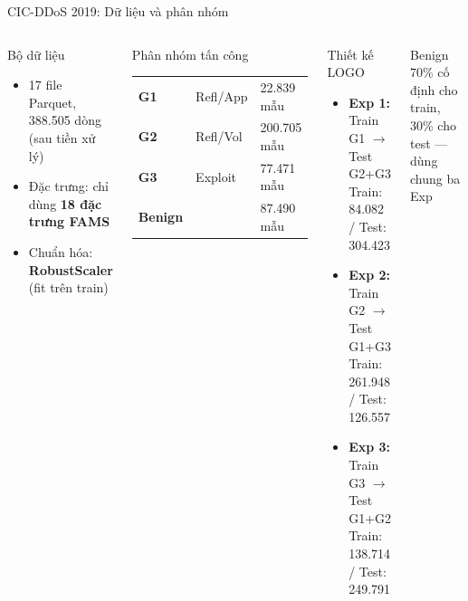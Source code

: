 \documentclass[aspectratio=169,12pt]{beamer}
\newcommand{\sidenote}[1]{\textcolor{mygray}{\small #1}}
\begin{document}
\begin{frame}{CIC-DDoS 2019: Dữ liệu và phân nhóm}
  \begin{columns}[T]
      \begin{block}{Bộ dữ liệu}
        \begin{itemize}
          \item 17 file Parquet, 388.505 dòng (sau tiền xử lý)
          \item Đặc trưng: chỉ dùng \textbf{18 đặc trưng FAMS}
          \item Chuẩn hóa: \textbf{RobustScaler} (fit trên train)
        \end{itemize}
      \end{block}
      \vspace{0.4em}
      \begin{block}{Phân nhóm tấn công}
        \small
        \begin{tabular}{lll}
          \textbf{G1} & Refl/App & 22.839 mẫu\\
          \textbf{G2} & Refl/Vol & 200.705 mẫu\\
          \textbf{G3} & Exploit  & 77.471 mẫu\\
          \textbf{Benign} &      & 87.490 mẫu\\
        \end{tabular}
      \end{block}
      \begin{alertblock}{Thiết kế LOGO}
        \small
        \begin{itemize}
          \item \textbf{Exp 1:} Train G1 $\to$ Test G2+G3\\
                Train: 84.082 / Test: 304.423
          \vspace{0.2em}
          \item \textbf{Exp 2:} Train G2 $\to$ Test G1+G3\\
                Train: 261.948 / Test: 126.557
          \vspace{0.2em}
          \item \textbf{Exp 3:} Train G3 $\to$ Test G1+G2\\
                Train: 138.714 / Test: 249.791
        \end{itemize}
      \end{alertblock}
      \vspace{0.3em}
      \sidenote{Benign 70\% cố định cho train, 30\% cho test --- dùng chung ba Exp}
  \end{columns}
\end{frame}
\end{document}
